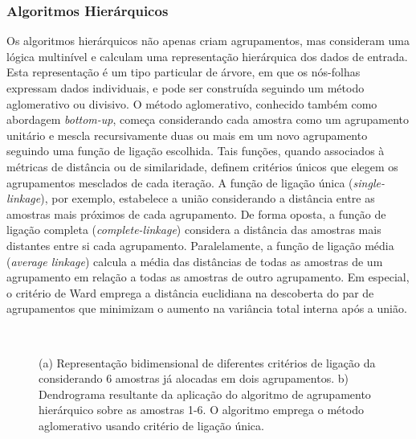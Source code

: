 \documentclass{SBCbookchapter}
\begin{document}
\subsubsection{Algoritmos Hierárquicos}
\label{subsubsec:hierarquico}

Os algoritmos hierárquicos não apenas criam agrupamentos, mas consideram uma lógica multinível e calculam uma representação hierárquica dos dados de entrada. Esta representação é um tipo particular de árvore, em que os nós-folhas expressam dados individuais, e pode ser construída seguindo um método aglomerativo ou divisivo. O método aglomerativo, conhecido também como abordagem \textit{bottom-up}, começa considerando cada amostra como um agrupamento unitário e mescla recursivamente duas ou mais em um novo agrupamento seguindo uma função de ligação escolhida. Tais funções, quando associados à métricas de distância ou de similaridade, definem critérios únicos que elegem os agrupamentos mesclados de cada iteração. A função de ligação única (\textit{single-linkage}), por exemplo, estabelece a união considerando a distância entre as amostras mais próximos de cada agrupamento. De forma oposta, a função de ligação completa (\textit{complete-linkage}) considera a distância das amostras mais distantes entre si cada agrupamento. Paralelamente, a função de ligação média (\textit{average linkage}) calcula a média das distâncias de todas as amostras de um agrupamento em relação a todas as amostras de outro agrupamento. Em especial, o critério de Ward emprega a distância euclidiana na descoberta do par de agrupamentos que minimizam o aumento na variância total interna após a união.

\begin{figure}[ht]
    \begin{center}
        \mbox{
        }
        \mbox{
        }
    \end{center}
    \caption{(a) Representação bidimensional de diferentes critérios de ligação da considerando 6 amostras já alocadas em dois agrupamentos. b) Dendrograma resultante da aplicação do algoritmo de agrupamento hierárquico sobre as amostras 1-6. O algoritmo emprega o método aglomerativo usando critério de ligação única.}
    \label{fig:hiearquico}
\end{figure}
\end{document}
